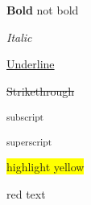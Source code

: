 \documentclass{article}
\begin{document}
	\textbf{Bold }not bold



	\emph{Italic}



	\underline{Underline}



	\sout{Strikethrough}



	\textsubscript{subscript}



	\textsuperscript{superscript}



	\colorbox{yellow}{highlight yellow}



	red text



\end{document}
